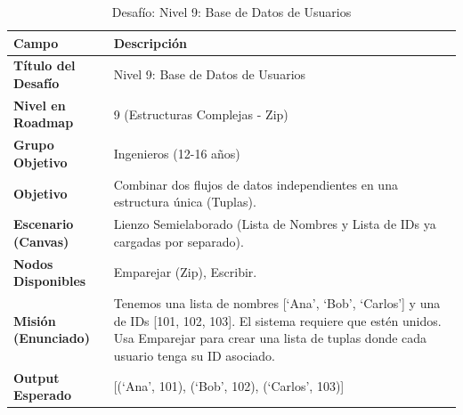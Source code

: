 \begin{table}[H]
    \centering
    \caption{Desafío: Nivel 9: Base de Datos de Usuarios}
    \label{tab:desafio-ing-9}
    \begingroup
    \renewcommand{\arraystretch}{\TableRowStretch}
    \begin{tabularx}{\textwidth}{ l X }
        \hline
        \textbf{Campo}              & \textbf{Descripción}                                                                                                                                                                                            \\
        \hline
        \textbf{Título del Desafío} & Nivel 9: Base de Datos de Usuarios                                                                                                                                                                              \\
        \textbf{Nivel en Roadmap}   & 9 (Estructuras Complejas - Zip)                                                                                                                                                                                 \\
        \textbf{Grupo Objetivo}     & Ingenieros (12-16 años)                                                                                                                                                                                         \\
        \textbf{Objetivo}           & Combinar dos flujos de datos independientes en una estructura única (Tuplas).                                                                                                                                   \\
        \textbf{Escenario (Canvas)} & Lienzo Semielaborado (Lista de Nombres y Lista de IDs ya cargadas por separado).                                                                                                                                \\
        \textbf{Nodos Disponibles}  & Emparejar (Zip), Escribir.                                                                                                                                                                                      \\
        \textbf{Misión (Enunciado)} & Tenemos una lista de nombres [`Ana', `Bob', `Carlos'] y una de IDs [101, 102, 103]. El sistema requiere que estén unidos. Usa Emparejar para crear una lista de tuplas donde cada usuario tenga su ID asociado. \\
        \textbf{Output Esperado}    & [(`Ana', 101), (`Bob', 102), (`Carlos', 103)]                                                                                                                                                                   \\
        \hline
    \end{tabularx}
    \endgroup
\end{table}

